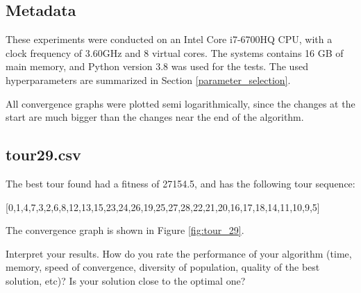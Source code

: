 \documentclass[a4paper,10pt]{article}
\newcommand{\ReplaceMe}[1]{{\color{blue}#1}}
\newcommand{\RemoveMe}[1]{{\color{purple}#1}}
\begin{document}

\subsection{Metadata}


These experiments were conducted on an Intel Core i7-6700HQ CPU, with a clock frequency of 3.60GHz and 8 virtual cores. The systems contains 16 GB of main memory, and Python version 3.8 was used for the tests. The used hyperparameters are summarized in Section \ref{parameter_selection}.

All convergence graphs were plotted semi logarithmically, since the changes at the start are much bigger than the changes near the end of the algorithm.

\subsection{tour29.csv}


The best tour found had a fitness of 27154.5, and has the following tour sequence: 

[0,1,4,7,3,2,6,8,12,13,15,23,24,26,19,25,27,28,22,21,20,16,17,18,14,11,10,9,5]

The convergence graph is shown in Figure \ref{fig:tour_29}.


Interpret your results. How do you rate the performance of your algorithm (time, memory, speed of convergence, diversity of population, quality of the best solution, etc)? Is your solution close to the optimal one?
\end{document}
